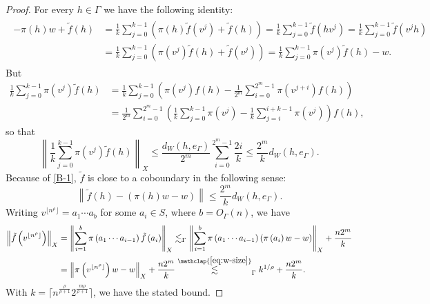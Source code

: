 \documentclass[11pt,reqno]{amsart}
\newcommand{\1}{\mathbf 1}
\begin{document}
\begin{proof}
For every $h\in \Gamma$ we have the following identity:
\begin{align}\label{B-1}
\begin{aligned}
-\pi\left(h\right)w+\tilde{f}\left(h\right)&=\frac 1k \sum_{j=0}^{k-1}\left(\pi\left(h\right)\tilde{f}\left(v^j\right)+\tilde{f}\left(h\right)\right)=\frac 1k \sum_{j=0}^{k-1}\tilde{f}\left(hv^j\right)=\frac 1k \sum_{j=0}^{k-1}\tilde{f}\left(v^jh\right)\\
&=\frac 1k \sum_{j=0}^{k-1}\left(\pi\left(v^j\right)\tilde{f}\left(h\right)+\tilde{f}\left(v^j\right)\right)=\frac 1k \sum_{j=0}^{k-1}\pi\left(v^j\right)\tilde{f}\left(h\right)-w.
\end{aligned}
\end{align}
But
\begin{align*}
\frac 1k \sum_{j=0}^{k-1}\pi\left(v^j\right)\tilde{f}\left(h\right)&=\frac 1k \sum_{j=0}^{k-1}\left(\pi\left(v^j\right)f\left(h\right)-\frac{1}{2^m}\sum_{i=0}^{2^m-1}\pi\left(v^{j+i}\right)f\left(h\right)\right)\\
&=\frac{1}{2^m}\sum_{i=0}^{2^m-1}\left(\frac 1k\sum_{j=0}^{k-1}\pi\left(v^j\right)-\frac 1k\sum_{j=i}^{i+k-1}\pi\left(v^j\right)\right)f\left(h\right),
\end{align*}
so that
\[
\left\|\frac 1k \sum_{j=0}^{k-1}\pi\left(v^j\right)\tilde{f}\left(h\right)\right\|_X \le \frac{d_W\left(h,e_\Gamma\right)}{2^m}\sum_{i=0}^{2^m-1}\frac{2i}{k}\le \frac{2^m}{k}d_W\left(h,e_\Gamma\right).
\]
Because of \eqref{B-1}, $\tilde{f}$ is close to a coboundary in the following sense:
\[
\left\|\tilde{f}\left(h\right)-\left(\pi\left(h\right)w-w\right)\right\|\le \frac{2^m}{k}d_W\left(h,e_\Gamma\right).
\]
Writing $v^{\lfloor n^\rho\rfloor}=a_1\cdots a_{b}$ for some $a_i\in S$, where $b=O_\Gamma\left(n\right)$, we have
\begin{align*}
\left\|\tilde{f}\left(v^{\lfloor n^\rho\rfloor}\right)\right\|_X&=\left\|\sum_{i=1}^{b}\pi\left(a_1\cdots a_{i-1}\right)\tilde{f}\left(a_i\right)\right\|_X\lesssim_\Gamma \left\|\sum_{i=1}^{b}\pi\left(a_1\cdots a_{i-1}\right)\left(\pi\left(a_i\right)w-w\right)\right\|_X+\frac{n2^m}{k}\\
&=\left\|\pi\left(v^{\lfloor n^\rho\rfloor}\right)w-w\right\|_X+\frac{n2^m}{k}\stackrel{\mathclap{\eqref{eq:w-size}}}{\lesssim}_\Gamma k^{1/\rho}+\frac{n2^m}{k}.
\end{align*}
With $k=\lceil n^{\frac{\rho}{\rho+1}}2^{\frac{m\rho}{\rho+1}}\rceil$, we have the stated bound.
\end{proof}
\end{document}
